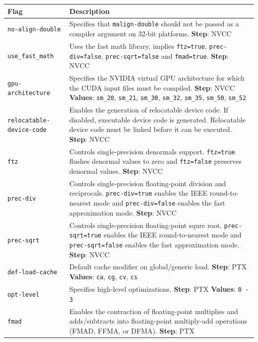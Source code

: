 \begin{table}[htpb]
    \centering
    \tiny
        \begin{tabular}{lp{}}
        \toprule
        \textbf{Flag}&\textbf{Description} \\\midrule
        \texttt{no-align-double} & Specifies that \texttt{malign-double} should not be passed as a compiler argument on 32-bit platforms. \textbf{Step}: NVCC \\ \midrule
        \texttt{use\_fast\_math} & Uses the fast math library, implies \texttt{ftz=true}, \texttt{prec-div=false}, \texttt{prec-sqrt=false} and \texttt{fmad=true}. \textbf{Step}: NVCC \\\midrule
        \texttt{gpu-architecture} & Specifies the NVIDIA virtual GPU architecture for which the CUDA input files must be compiled. \textbf{Step}: NVCC \textbf{Values}: \texttt{sm\_20}, \texttt{sm\_21}, \texttt{sm\_30}, \texttt{sm\_32}, \texttt{sm\_35}, \texttt{sm\_50}, \texttt{sm\_52} \\\midrule
        \texttt{relocatable-device-code} & Enables the generation of relocatable device code. If disabled, executable device code is generated. Relocatable device code must be linked before it can be executed. \textbf{Step}: NVCC \\\midrule
        \texttt{ftz} & Controls single-precision denormals support. \texttt{ftz=true} flushes denormal values to zero and \texttt{ftz=false} preserves denormal values. \textbf{Step}: NVCC \\\midrule
        \texttt{prec-div} & Controls single-precision floating-point division and reciprocals. \texttt{prec-div=true} enables the IEEE round-to-nearest mode and \texttt{prec-div=false} enables the fast approximation mode. \textbf{Step}: NVCC \\\midrule
        \texttt{prec-sqrt} & Controls single-precision floating-point squre root. \texttt{prec-sqrt=true} enables the IEEE round-to-nearest mode and \texttt{prec-sqrt=false} enables the fast approximation mode. \textbf{Step}: NVCC \\\midrule
        \texttt{def-load-cache} & Default cache modifier on global/generic load. \textbf{Step}: PTX \textbf{Values}: \texttt{ca}, \texttt{cg}, \texttt{cv}, \texttt{cs} \\\midrule
        \texttt{opt-level} & Specifies high-level optimizations. \textbf{Step}: PTX \textbf{Values}: \texttt{0 - 3} \\\midrule
        \texttt{fmad} & Enables the contraction of floating-point multiplies and adds/subtracts into floating-point multiply-add operations (FMAD, FFMA, or DFMA). \textbf{Step}: PTX \\\midrule

\end{tabular}
\end{table}
